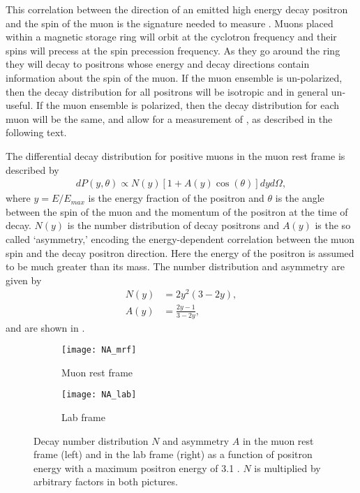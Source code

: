 This correlation between the direction of an emitted high energy decay positron and the spin of the muon is the signature needed to measure \wa. Muons placed within a magnetic storage ring will orbit at the cyclotron frequency and their spins will precess at the spin precession frequency. As they go around the ring they will decay to positrons whose energy and decay directions contain information about the spin of the muon. If the muon ensemble is un-polarized, then the decay distribution for all positrons will be isotropic and in general un-useful. If the muon ensemble is polarized, then the decay distribution for each muon will be the same, and allow for a measurement of \wa, as described in the following text.


The differential decay distribution for positive muons in the muon rest frame is described by \cite{Bucksbaum}
        \begin{align} \label{eq:diffdecaydist}
            dP(y, \theta) \propto N(y)[1 + A(y)\cos(\theta)]dy d\Omega,
        \end{align}
where $y=E/E_{max}$ is the energy fraction of the positron and $\theta$ is the angle between the spin of the muon and the momentum of the positron at the time of decay. $N(y)$ is the number distribution of decay positrons and $A(y)$ is the so called `asymmetry,' encoding the energy-dependent correlation between the muon spin and the decay positron direction. Here the energy of the positron is assumed to be much greater than its mass. The number distribution and asymmetry are given by \cite{Bucksbaum}
        \begin{align}
            N(y) &= 2y^{2}(3-2y), \label{eq:Nmrf} \\
            A(y) &= \frac{2y-1}{3-2y}, \label{eq:Amrf}
        \end{align}
and are shown in . 

\begin{figure}
\centering
    \begin{subfigure}[]{0.45\textwidth}
        \centering
        \texttt{[image: NA\_mrf]}
        \caption{Muon rest frame}
    \label{fig:NA2mrf}
    \end{subfigure}%
    \hspace{1cm}
    \begin{subfigure}[]{0.45\textwidth}
        \centering
        \texttt{[image: NA\_lab]}
        \caption{Lab frame}
    \label{fig:NA2lab}    
    \end{subfigure}
\caption[Number distribution and asymmetry for muon decay in the muon rest frame and lab frame]{Decay number distribution $N$ and asymmetry $A$ in the muon rest frame (left) and in the lab frame (right) as a function of positron energy with a maximum positron energy of 3.1 \GeV. $N$ is multiplied by arbitrary factors in both pictures.}
\label{fig:NA2}
\end{figure}

